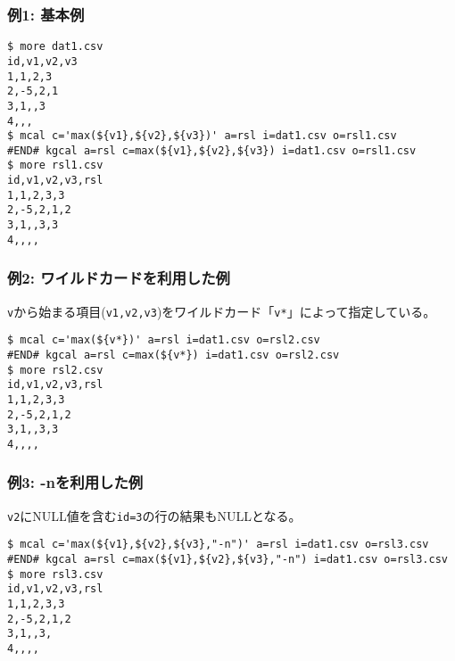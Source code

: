 \subsubsection*{例1: 基本例}



\begin{Verbatim}[baselinestretch=0.7,frame=single]
$ more dat1.csv
id,v1,v2,v3
1,1,2,3
2,-5,2,1
3,1,,3
4,,,
$ mcal c='max(${v1},${v2},${v3})' a=rsl i=dat1.csv o=rsl1.csv
#END# kgcal a=rsl c=max(${v1},${v2},${v3}) i=dat1.csv o=rsl1.csv
$ more rsl1.csv
id,v1,v2,v3,rsl
1,1,2,3,3
2,-5,2,1,2
3,1,,3,3
4,,,,
\end{Verbatim}
\subsubsection*{例2: ワイルドカードを利用した例}

\verb|v|から始まる項目(\verb|v1,v2,v3|)をワイルドカード「\verb|v*|」によって指定している。


\begin{Verbatim}[baselinestretch=0.7,frame=single]
$ mcal c='max(${v*})' a=rsl i=dat1.csv o=rsl2.csv
#END# kgcal a=rsl c=max(${v*}) i=dat1.csv o=rsl2.csv
$ more rsl2.csv
id,v1,v2,v3,rsl
1,1,2,3,3
2,-5,2,1,2
3,1,,3,3
4,,,,
\end{Verbatim}
\subsubsection*{例3: -nを利用した例}

\verb|v2|にNULL値を含む\verb|id=3|の行の結果もNULLとなる。


\begin{Verbatim}[baselinestretch=0.7,frame=single]
$ mcal c='max(${v1},${v2},${v3},"-n")' a=rsl i=dat1.csv o=rsl3.csv
#END# kgcal a=rsl c=max(${v1},${v2},${v3},"-n") i=dat1.csv o=rsl3.csv
$ more rsl3.csv
id,v1,v2,v3,rsl
1,1,2,3,3
2,-5,2,1,2
3,1,,3,
4,,,,
\end{Verbatim}
